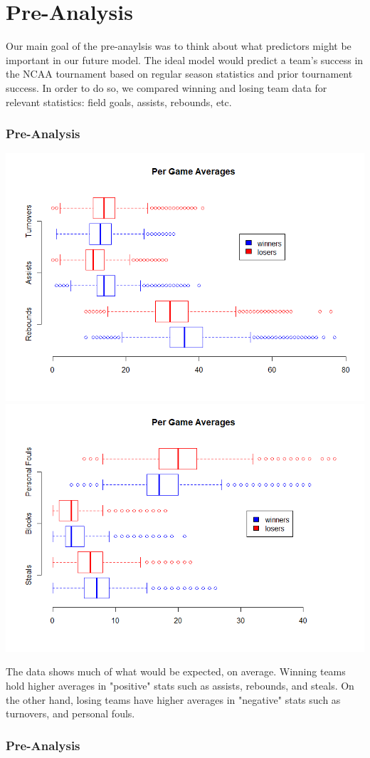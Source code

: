 \documentclass[11pt]{beamer}
\begin{document}
\section{Pre-Analysis}
\begin{frame}
\center Our main goal of the pre-anaylsis was to think about what predictors might be important in our future model. The ideal model would predict a team's success in the NCAA tournament based on regular season statistics and prior tournament success. In order to do so, we compared winning and losing team data for relevant statistics: field goals, assists, rebounds, etc. 
\frametitle{{\textbf{\huge Pre-Analysis}}}
\end{frame}
\begin{frame}
	\begin{center}
		\includegraphics[scale=0.255]{GameAverages.png}
		\includegraphics[scale=0.255]{GameAverages2.png}  
	\end{center}
\footnotesize \center The data shows much of what would be expected, on average. Winning teams hold higher averages in "positive" stats such as assists, rebounds, and steals. On the other hand, losing teams have higher averages in "negative" stats such as turnovers, and personal fouls.
\frametitle{{\textbf{\huge Pre-Analysis}}}
\end{frame}
\end{document}
